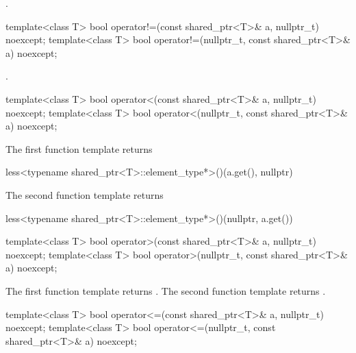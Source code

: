 \begin{itemdescr}
\pnum
\returns {}.
\end{itemdescr}

%
\begin{itemdecl}
template<class T>
  bool operator!=(const shared_ptr<T>& a, nullptr_t) noexcept;
template<class T>
  bool operator!=(nullptr_t, const shared_ptr<T>& a) noexcept;
\end{itemdecl}

\begin{itemdescr}
\pnum
\returns {}.
\end{itemdescr}

%
\begin{itemdecl}
template<class T>
  bool operator<(const shared_ptr<T>& a, nullptr_t) noexcept;
template<class T>
  bool operator<(nullptr_t, const shared_ptr<T>& a) noexcept;
\end{itemdecl}

\begin{itemdescr}
\pnum
\returns
The first function template returns
\begin{codeblock}
less<typename shared_ptr<T>::element_type*>()(a.get(), nullptr)
\end{codeblock}
The second function template returns
\begin{codeblock}
less<typename shared_ptr<T>::element_type*>()(nullptr, a.get())
\end{codeblock}
\end{itemdescr}

%
\begin{itemdecl}
template<class T>
  bool operator>(const shared_ptr<T>& a, nullptr_t) noexcept;
template<class T>
  bool operator>(nullptr_t, const shared_ptr<T>& a) noexcept;
\end{itemdecl}

\begin{itemdescr}
\pnum
\returns
The first function template returns .
The second function template returns .
\end{itemdescr}

%
\begin{itemdecl}
template<class T>
  bool operator<=(const shared_ptr<T>& a, nullptr_t) noexcept;
template<class T>
  bool operator<=(nullptr_t, const shared_ptr<T>& a) noexcept;
\end{itemdecl}

